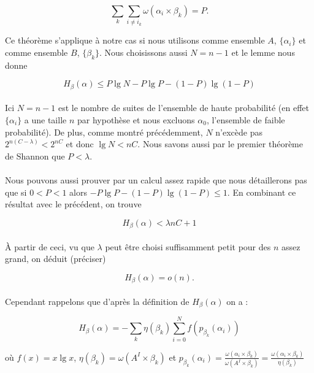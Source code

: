 	\[\sum_k\sum_{i\neq i_k}\omega(\alpha_i \times \beta_k) = P.\]	
	
	Ce théorème s'applique à notre cas si nous utilisons comme ensemble $A$,
	$\{\alpha_i\}$ et comme ensemble $B$, $\{\beta_k\}$. Nous choisissons
	aussi $N = n-1$ et le lemme nous donne
	
	\[H_\beta(\alpha)\le P\lg N - P\lg P - (1-P)\lg(1-P)\]
	
	\paragraph{}
	Ici $N = n-1$ est le nombre de suites de l'ensemble de haute probabilité 
	(en effet $\{\alpha_i\}$ a une taille $n$ par hypothèse et nous excluons
	$\alpha_0$, l'ensemble de faible probabilité). De plus, comme montré 
	précédemment, $N$ n'excède pas $2^{n(C-\lambda)}<2^{nC}$ et donc 
	$\lg N<nC$. Nous savons aussi par le premier théorème de Shannon 
	que $P<\lambda$.
	
	\paragraph{}
	Nous pouvons aussi prouver par un calcul assez rapide que nous détaillerons 
	pas que si $0<P<1$ alors $-P\lg P -(1-P)\lg(1-P)\le 1$. En combinant ce 
	résultat avec le précédent,	on trouve
	
	\[H_\beta(\alpha) < \lambda nC + 1\]
	
	\paragraph{}
	À partir de ceci, vu que $\lambda$ peut être choisi suffisamment petit pour
	 des $n$ assez grand, on déduit (préciser)
	
	\[H_\beta(\alpha)=o(n).\]
	
	\paragraph{}
	Cependant rappelons que d'après la définition de $H_\beta(\alpha)$ on a :
	
	\[
		H_\beta(\alpha) = 
		- \sum_k\eta(\beta_k)\sum_{i=0}^Nf(p_{\beta_k}(\alpha_i))
	\]
	
	où $f(x) = x \lg x$, $\eta(\beta_k) = \omega(A^I \times \beta_k)$ 
	et 
		$p_{\beta_k}(\alpha_i) = 
		\frac{\omega(\alpha_i \times \beta_k)}{\omega(A^I \times \beta_k)}=
		\frac{\omega(\alpha_i \times \beta_k)}{\eta(\beta_k)}$	
	

